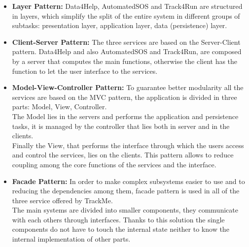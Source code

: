 \documentclass[a4paper]{article}
\begin{document}
\begin{itemize}
    \item \textbf{Layer Pattern:}
     Data4Help, AutomatedSOS and Track4Run are structured in layers, which simplify the split of the entire system in different groups of subtasks: presentation layer, application layer, data (persistence) layer.
     
    \item \textbf{Client-Server Pattern:} The three services are based on the Server-Client pattern. Data4Help and also AutomatedSOS and Track4Run, are composed by a server that computes the main functions, otherwise the client has the function to let the user interface to the services.
    
    \item \textbf{Model-View-Controller Pattern:} To guarantee better modularity all the services are based on the MVC pattern, the application is divided in three parts: Model, View, Controller. \\ 
    The Model lies in the servers and performs the application and persistence tasks, it is managed by the controller that lies both in server and in the clients. \\
    Finally the View, that performs the interface through which the users access and control the services, lies on the clients. This pattern allows to reduce coupling among the core functions of the services and the interface.
    
    \item \textbf{Facade Pattern:} In order to make complex subsystems easier to use and to reducing the dependencies among them, facade pattern is used in all of the three service offered by TrackMe. \\
    The main systems are divided into smaller components, they communicate with each others through interfaces. Thanks to this solution the single components do not have to touch the internal state neither to know the internal implementation of other parts.
\end{itemize}
\clearpage
\end{document}
